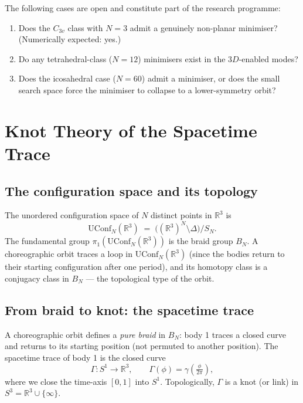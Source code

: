 \documentclass[12pt, a4paper]{article}
\theoremstyle{plain}
\theoremstyle{definition}
\newcommand{\R}{\mathbb{R}}
\begin{document}
The following cases are open and constitute part of the research
programme:
\begin{enumerate}[leftmargin=1.8em]
  \item Does the $C_{3v}$ class with $N=3$ admit a genuinely
        non-planar minimiser? (Numerically expected: yes.)
  \item Do any tetrahedral-class ($N=12$) minimisers exist in the
        $3D$-enabled modes?
  \item Does the icosahedral case ($N=60$) admit a minimiser, or
        does the small search space force the minimiser to collapse
        to a lower-symmetry orbit?
\end{enumerate}

\section{Knot Theory of the Spacetime Trace}

\subsection{The configuration space and its topology}

The unordered configuration space of $N$ distinct points in $\R^3$ is
\[
  \mathrm{UConf}_N(\R^3)
  \;=\;
  \bigl((\R^3)^N \setminus \Delta\bigr) / S_N.
\]
The fundamental group $\pi_1(\mathrm{UConf}_N(\R^3))$ is the braid
group $B_N$.  A choreographic orbit traces a loop in
$\mathrm{UConf}_N(\R^3)$ (since the bodies return to their starting
configuration after one period), and its homotopy class is a conjugacy
class in $B_N$ — the topological type of the orbit.

\subsection{From braid to knot: the spacetime trace}

A choreographic orbit defines a \emph{pure braid} in $B_N$: body 1
traces a closed curve and returns to its starting position (not
permuted to another position).  The spacetime trace of body 1 is the
closed curve
\begin{equation}\label{eq:strace}
  \Gamma : S^1 \to \R^3,
  \qquad
  \Gamma(\phi) = \gamma\!\left(\tfrac{\phi}{2\pi}\right),
\end{equation}
where we close the time-axis $[0,1]$ into $S^1$.  Topologically,
$\Gamma$ is a knot (or link) in $S^3 = \R^3 \cup \{\infty\}$.
\end{document}

